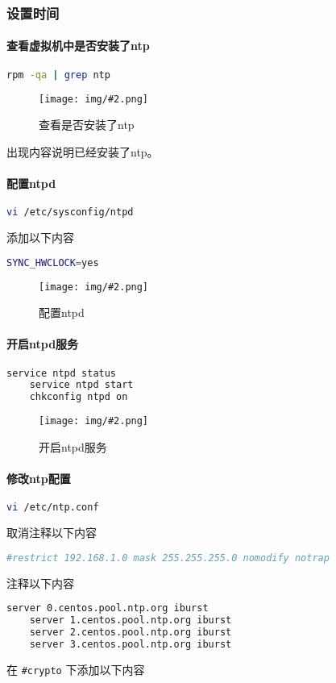 \documentclass{article}
\newcommand{\img}[3][0.9]{%
    \begin{figure}[H]
        \centering
        \texttt{[image: img/\#2.png]}
        \caption{#3}
    \end{figure}
}
\newcommand{\subsubsubsection}[1]{\paragraph{#1}\mbox{}}
\begin{document}
\subsubsection{设置时间}

\subsubsubsection{查看虚拟机中是否安装了ntp}

\begin{lstlisting}[language=bash]
    rpm -qa | grep ntp
\end{lstlisting}

\img{6.1.1.1}{查看是否安装了ntp}

出现内容说明已经安装了ntp。

\subsubsubsection{配置ntpd}

\begin{lstlisting}[language=bash]
    vi /etc/sysconfig/ntpd
\end{lstlisting}

添加以下内容

\begin{lstlisting}[language=bash]
    SYNC_HWCLOCK=yes
\end{lstlisting}

\img{6.1.2.1}{配置ntpd}

\subsubsubsection{开启ntpd服务}

\begin{lstlisting}[language=bash]
    service ntpd status
    service ntpd start
    chkconfig ntpd on
\end{lstlisting}

\img{6.1.3.1}{开启ntpd服务}

\subsubsubsection{修改ntp配置}

\begin{lstlisting}[language=bash]
    vi /etc/ntp.conf
\end{lstlisting}

取消注释以下内容

\begin{lstlisting}[language=bash]
    #restrict 192.168.1.0 mask 255.255.255.0 nomodify notrap
\end{lstlisting}

注释以下内容

\begin{lstlisting}[language=bash]
    server 0.centos.pool.ntp.org iburst
    server 1.centos.pool.ntp.org iburst
    server 2.centos.pool.ntp.org iburst
    server 3.centos.pool.ntp.org iburst
\end{lstlisting}

在 \texttt{\#crypto} 下添加以下内容
\end{document}
